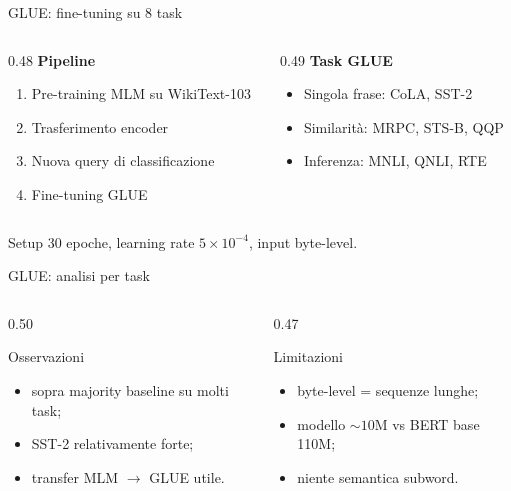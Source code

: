 \documentclass[aspectratio=169,10pt]{beamer}
\begin{document}
\begin{frame}{GLUE: fine-tuning su 8 task}
\small
\begin{columns}[T]
\begin{column}{0.48\textwidth}
\textbf{Pipeline}
\begin{enumerate}
  \item Pre-training MLM su WikiText-103
  \item Trasferimento encoder
  \item Nuova query di classificazione
  \item Fine-tuning GLUE
\end{enumerate}
\end{column}
\begin{column}{0.49\textwidth}
\textbf{Task GLUE}
\begin{itemize}
  \item Singola frase: CoLA, SST-2
  \item Similarità: MRPC, STS-B, QQP
  \item Inferenza: MNLI, QNLI, RTE
\end{itemize}
\end{column}
\end{columns}

\begin{block}{Setup}
30 epoche, learning rate $5 \times 10^{-4}$, input byte-level.
\end{block}
\end{frame}

\begin{frame}{GLUE: analisi per task}
\small
\begin{columns}[T]
\begin{column}{0.50\textwidth}
\begin{exampleblock}{Osservazioni}
\begin{itemize}
  \item sopra majority baseline su molti task;
  \item SST-2 relativamente forte;
  \item transfer MLM $\rightarrow$ GLUE utile.
\end{itemize}
\end{exampleblock}
\end{column}
\begin{column}{0.47\textwidth}
\begin{alertblock}{Limitazioni}
\begin{itemize}
  \item byte-level = sequenze lunghe;
  \item modello $\sim10$M vs BERT base 110M;
  \item niente semantica subword.
\end{itemize}
\end{alertblock}
\end{column}
\end{columns}
\end{frame}
\end{document}
